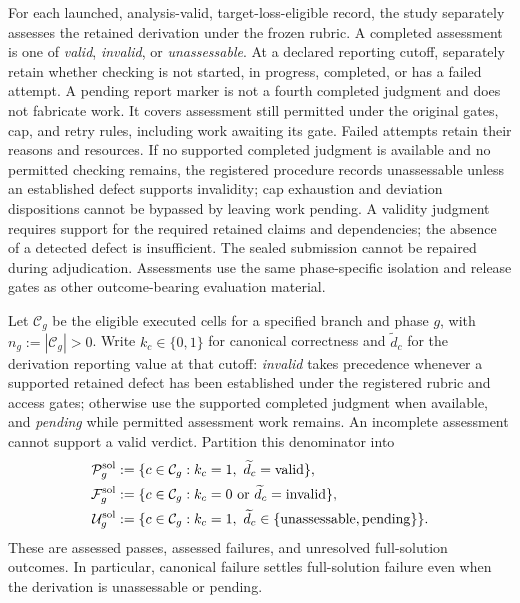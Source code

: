 \documentclass[10pt]{article} %
\providecommand{\1}{\mathbf{1}}  %
\theoremstyle{remark}
\theoremstyle{definition}
\begin{document}
For each launched, analysis-valid, target-loss-eligible record, the
study separately assesses the retained derivation under the frozen
rubric. A completed assessment is one of \emph{valid}, \emph{invalid}, or
\emph{unassessable}. At a declared reporting cutoff, separately retain
whether checking is not started, in progress, completed, or has a failed
attempt. A pending report marker is not a fourth completed judgment and
does not fabricate work. It covers assessment still permitted under the
original gates, cap, and retry rules, including work awaiting its gate.
Failed attempts retain their reasons and resources. If no supported
completed judgment is available and no permitted checking remains, the
registered procedure records unassessable unless an established defect
supports invalidity; cap exhaustion and deviation
dispositions cannot be bypassed by leaving work pending. A validity
judgment requires support for the
required retained claims and dependencies; the absence of a detected
defect is insufficient. The sealed submission cannot be repaired during
adjudication. Assessments use the same phase-specific isolation and
release gates as other outcome-bearing evaluation material.

Let $\mathcal C_g$ be the eligible executed cells for a specified
branch and phase $g$, with $n_g:=|\mathcal C_g|>0$. Write
$k_c\in\{0,1\}$ for canonical correctness and $\widetilde d_c$ for
the derivation reporting value at that cutoff: \emph{invalid} takes
precedence whenever a supported retained defect has been established
under the registered rubric and access gates; otherwise use the supported
completed judgment when available, and \emph{pending} while permitted
assessment work remains.
An incomplete assessment cannot support a valid verdict. Partition this
denominator into
\begin{align}
\mathcal P_g^{\mathrm{sol}}
&:=\{c\in\mathcal C_g:k_c=1,\ \widetilde d_c=\mathrm{valid}\},
\notag\\
\mathcal F_g^{\mathrm{sol}}
&:=\{c\in\mathcal C_g:k_c=0
\ \text{or}\ \widetilde d_c=\mathrm{invalid}\},
\notag\\
\mathcal U_g^{\mathrm{sol}}
&:=\{c\in\mathcal C_g:k_c=1,\ \widetilde d_c\in\{\mathrm{unassessable},\mathrm{pending}\}\}.
\label{eq:solution-assessment-partition}
\end{align}
These are assessed passes, assessed failures, and unresolved
full-solution outcomes. In particular, canonical failure settles
full-solution failure even when the derivation is unassessable or pending.
\end{document}
